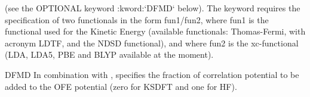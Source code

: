 \begin{keywordlist}
\begin{inputlisting}
\end{inputlisting}
(see the OPTIONAL keyword :kword:`DFMD` below).
The keyword  requires the specification of two functionals in the form fun1/fun2, where fun1 is the functional
used for the Kinetic Energy (available functionals: Thomas-Fermi, with acronym LDTF, and the NDSD functional), and where
fun2 is the xc-functional (LDA, LDA5, PBE and BLYP available at the moment).
\item[DFMD]
In combination with , specifies the fraction of correlation potential to be added to the OFE potential (zero for
KSDFT and one for HF).

\end{keywordlist}
